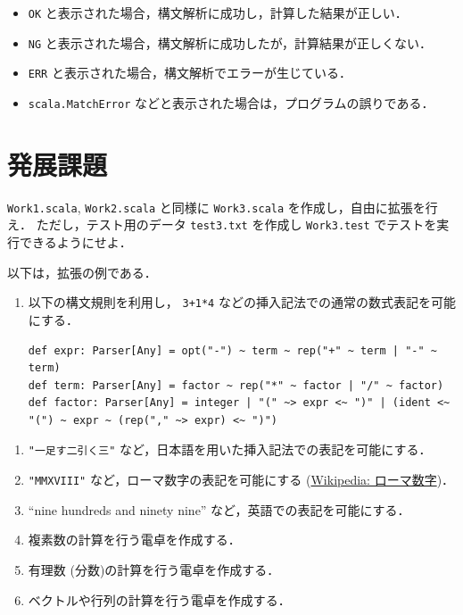 \documentclass[a4j]{jsarticle}
\begin{document}
\begin{itemize}
\item \texttt{OK} と表示された場合，構文解析に成功し，計算した結果が正しい．
\item \texttt{NG} と表示された場合，構文解析に成功したが，計算結果が正しくない．
\item \texttt{ERR} と表示された場合，構文解析でエラーが生じている．
\item \texttt{scala.MatchError} などと表示された場合は，プログラムの誤りである．
\end{itemize}
\section{発展課題}
\label{sec-8}

\texttt{Work1.scala}, \texttt{Work2.scala} と同様に \texttt{Work3.scala} を作成し，自由に拡張を行え．
ただし，テスト用のデータ \texttt{test3.txt} を作成し \texttt{Work3.test} でテストを実行できるようにせよ．

以下は，拡張の例である．

\begin{enumerate}
\item 以下の構文規則を利用し， \texttt{3+1*4} などの挿入記法での通常の数式表記を可能にする．

\begin{verbatim}
def expr: Parser[Any] = opt("-") ~ term ~ rep("+" ~ term | "-" ~ term)
def term: Parser[Any] = factor ~ rep("*" ~ factor | "/" ~ factor)
def factor: Parser[Any] = integer | "(" ~> expr <~ ")" | (ident <~ "(") ~ expr ~ (rep("," ~> expr) <~ ")")
\end{verbatim}
\end{enumerate}
\begin{enumerate}
\item \texttt{"一足す二引く三"} など，日本語を用いた挿入記法での表記を可能にする．
\item \texttt{"MMXVIII"} など，ローマ数字の表記を可能にする (\href{https://ja.wikipedia.org/wiki/%E3%83%AD%E3%83%BC%E3%83%9E%E6%95%B0%E5%AD%97}{Wikipedia: ローマ数字})．
\item ``nine hundreds and ninety nine'' など，英語での表記を可能にする．
\item 複素数の計算を行う電卓を作成する．
\item 有理数 (分数)の計算を行う電卓を作成する．
\item ベクトルや行列の計算を行う電卓を作成する．
\end{enumerate}
\end{document}
